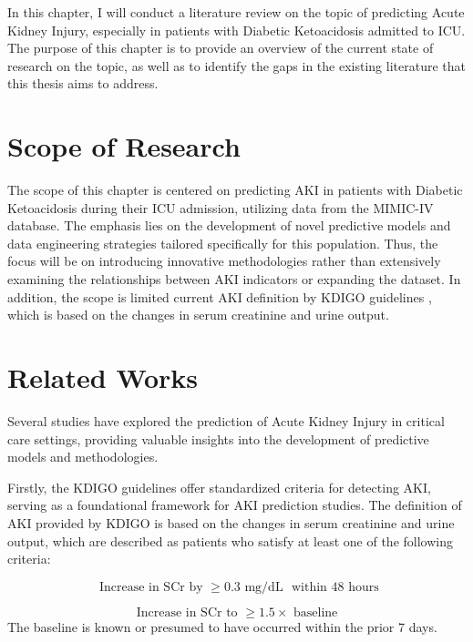 \documentclass[../main.tex]{subfiles}
\begin{document}
\par In this chapter, I will conduct a literature review on the topic of predicting Acute Kidney Injury, especially in patients with Diabetic Ketoacidosis admitted to ICU.
The purpose of this chapter is to provide an overview of the current state of research on the topic, as well as to identify the gaps in the existing literature that this thesis aims to address.


\section{Scope of Research}
The scope of this chapter is centered on predicting \gls{AKI} in patients with Diabetic Ketoacidosis  during their \gls{ICU} admission, utilizing data from the \gls{MIMIC-IV} database.
The emphasis lies on the development of novel predictive models and data engineering strategies tailored specifically for this population.
Thus, the focus will be on introducing innovative methodologies rather than extensively examining the relationships between \gls{AKI} indicators or expanding the dataset.
In addition, the scope is limited current \gls{AKI} definition by KDIGO guidelines \cite{kdigo-aki-guideline}, which is based on the changes in serum creatinine and urine output.


\section{Related Works}

Several studies have explored the prediction of Acute Kidney Injury in critical care settings, providing valuable insights into the development of predictive models and methodologies.

Firstly, the KDIGO guidelines \cite{kdigo-aki-guideline} offer standardized criteria for detecting AKI, serving as a foundational framework for \gls{AKI} prediction studies.
The definition of \gls{AKI} provided by \gls{KDIGO} is based on the changes in serum creatinine and urine output, which are described as patients who satisfy at least one of the following criteria:

\begin{equation}
    \text{ Increase in SCr by } \geq 0.3 \text{ mg/dL } \text{ within 48 hours}
\end{equation}

\begin{equation}
    \text{ Increase in SCr to } \geq 1.5 \times \text{ baseline }
\end{equation}
The baseline is known or presumed to have occurred within the prior 7 days.
\end{document}
